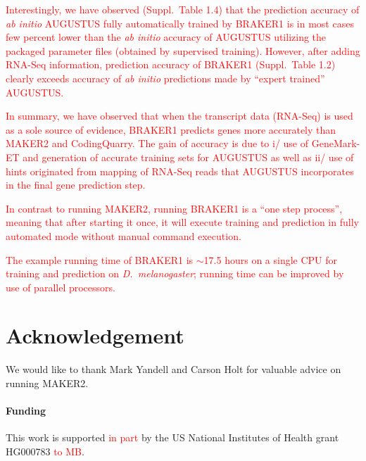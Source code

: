 \documentclass{bioinfo}
\begin{document}
\textcolor{red}{Interestingly, we have observed (Suppl.~Table 1.4) that the prediction accuracy of \textit{ab initio} AUGUSTUS fully automatically trained by BRAKER1 is in most cases few percent lower than the \textit{ab initio} accuracy of AUGUSTUS utilizing the packaged parameter files (obtained by supervised training). However, after adding RNA-Seq information, prediction accuracy of BRAKER1 (Suppl.~Table 1.2) clearly exceeds accuracy of \textit{ab initio} predictions made by ``expert trained'' AUGUSTUS.}

\textcolor{red}{In summary, we have observed that when the transcript data (RNA-Seq) is used as a sole source of evidence, BRAKER1 predicts genes more accurately than MAKER2 and CodingQuarry. The gain of accuracy is due to i/ use of GeneMark-ET and generation of accurate training sets for AUGUSTUS as well as ii/ use of hints originated from mapping of RNA-Seq reads that AUGUSTUS incorporates in the final gene prediction step.}

\textcolor{red}{In contrast to running MAKER2, running BRAKER1 is a ``one step process'', meaning that after starting it once, it will execute training and prediction in fully automated mode without manual command execution.}

\textcolor{red}{The example running time of BRAKER1 is $\sim$17.5 hours on a single CPU for training and prediction on \textit{D.~melanogaster}; running time can be improved by use of parallel processors.}


\section*{Acknowledgement}

We would like to thank Mark Yandell and Carson Holt for valuable advice on running MAKER2.

\paragraph{Funding\textcolon} This work is supported \textcolor{red}{in part} by the US National Institutes of Health grant HG000783 \textcolor{red}{to MB}.

%
%
%
%
%
%
%
%
%
\end{document}
